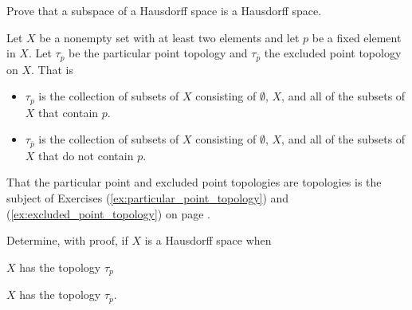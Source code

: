 \item \label{ex:Closed_sets:Hausdorff_subspace} Prove that a subspace of a Hausdorff space is a Hausdorff space. 

\begin{comment}

\ExerciseSolution Let $(X, \tau_X)$ be a Hausdorff topological space and let $Y$ be a subspace of $X$ with induced topology $\tau_Y$. To prove that $Y$ is a Hausdorff space, let $y_1$ and $y_2$ be distinct elements of $Y$. We will demonstrate that there exist disjoint open sets $U_1$ and $U_2$ in $Y$ such that $y_1 \in U_1$ and $y_2 \in U_2$. Now $Y \subseteq X$ and so $y_1, y_2 \in X$. Since $X$ is a Hausdorff space, there exist disjoint open sets $O_1$ and $O_2$ in $X$ with $y_1 \in O_1$ and $y_2 \in O_2$. Let $U_1 = \ O_1 \cap Y$ and $U_2 = O_2 \cap Y$. Then $U_1, U_2 \in \tau_Y$, and 
\[U_1 \cap U_2 = (O_1 \cap Y) \cap (O_2 \cap Y) = (O_1 \cap O_2) \cap Y = \emptyset.\]
The fact that $y_1 \in Y$ and $y_1 \in O_1$ implies that $y_1 \in U_1$. Similarly, $y_2 \in U_2$. Therefore, $Y$ is a Hausdorff space. 

\end{comment}

\item Let $X$ be a nonempty set with at least two elements and let $p$ be a fixed element in $X$. Let $\tau_p$ be the particular point topology and $\tau_{\overline{p}}$ the excluded point topology on $X$. That is
\begin{itemize}
\item $\tau_{p}$ is the collection of subsets of $X$ consisting of $\emptyset$, $X$, and all of the subsets of $X$ that contain $p$.  
\item $\tau_{\overline{p}}$ is the collection of subsets of $X$ consisting of $\emptyset$, $X$, and all of the subsets of $X$ that do not contain $p$.
\end{itemize}
That the particular point and excluded point topologies are topologies is the subject of Exercises (\ref{ex:particular_point_topology}) and (\ref{ex:excluded_point_topology}) on page \pageref{ex:particular_point_topology}. 

Determine, with proof, if $X$ is a Hausdorff space when 	
	\ba
	\item $X$ has the topology $\tau_{p}$
	
	\item $X$ has the topology $\tau_{\overline{p}}$.
	
	\ea
	
